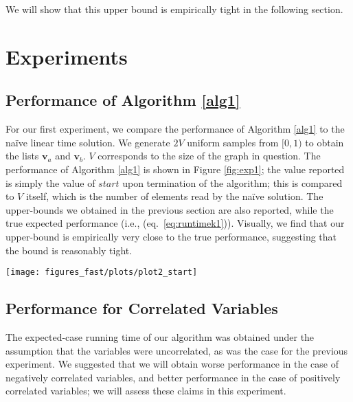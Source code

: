 \documentclass[a4paper,10pt]{article}
\newcommand{\eq}[1]{(eq.~\ref{#1})}
\begin{document}
We will show that this upper bound is empirically tight in the following section.

\section{Experiments}
\label{sec:experiments}

\subsection{Performance of Algorithm \ref{alg1}}

For our first experiment, we compare the performance of Algorithm \ref{alg1} to the na\"ive linear time solution. We generate $2V$ uniform samples from $[0,1)$ to obtain the lists $\mathbf{v}_a$ and $\mathbf{v}_b$. $V$ corresponds to the size of the graph in question. The performance of Algorithm \ref{alg1} is shown in Figure \ref{fig:exp1}; the value reported is simply the value of $\mathit{start}$ upon termination of the algorithm; this is compared to $V$ itself, which is the number of elements read by the na\"ive solution. The upper-bounds we obtained in the previous section are also reported, while the true expected performance (i.e., \eq{eq:runtimek1}). Visually, we find that our upper-bound is empirically very close to the true performance, suggesting that the bound is reasonably tight.

\begin{figure*}
 \begin{center}
  \texttt{[image: figures\_fast/plots/plot2\_start]}\end{center}
\caption{Performance of our algorithm and bounds. For $K=2$, the exact expectation is shown, which appears to precisely match the average performance (over 100 trials). The dotted lines show the upper-bound, which appears to be extremely close to the average performance, indicating that the bound is reasonably tight.}
\label{fig:exp1}
\end{figure*}



\subsection{Performance for Correlated Variables}

The expected-case running time of our algorithm was obtained under the assumption that the variables were uncorrelated, as was the case for the previous experiment. We suggested that we will obtain worse performance in the case of negatively correlated variables, and better performance in the case of positively correlated variables; we will assess these claims in this experiment.
\end{document}
